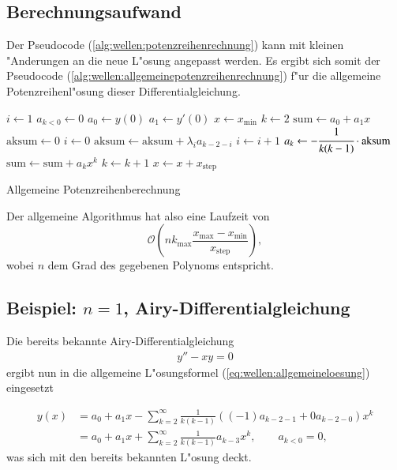 \subsection{Berechnungsaufwand}
Der Pseudocode (\ref{alg:wellen:potenzreihenrechnung}) kann mit kleinen 
"Anderungen an die neue L"osung angepasst werden. Es ergibt sich somit der 
Pseudocode (\ref{alg:wellen:allgemeinepotenzreihenrechnung}) f"ur die 
allgemeine Potenzreihenl"osung dieser Differentialgleichung.

\begin{algorithm}
	\begin{algorithmic}[1]
		\State $i \gets 1$
		\State $a_{k<0} \gets 0$
		\State $a_0 \gets y(0)$
		\State $a_1 \gets y'(0)$
		\State $x \gets x_{\text{min}}$
			\State $k \gets 2$
			\State $\text{sum} \gets a_0 + a_1x$
				\State $\text{aksum} \gets 0$
				\State $i \gets 0$
					\State $\text{aksum} \gets \text{aksum}+\lambda_i a_{k-2-i}$
					\State $i \gets i + 1$
				\EndFor
				\State $a_k \gets -\cfrac{1}{k(k-1)} \cdot \text{aksum}$
				\State $\text{sum} \gets \text{sum} + a_k x^k$
				\State $k \gets k + 1$
			\EndFor
			\State $x \gets x + x_{\text{step}}$
		\EndFor
	\end{algorithmic}
	\caption{Allgemeine Potenzreihenberechnung} 
	\label{alg:wellen:allgemeinepotenzreihenrechnung}
\end{algorithm}

Der allgemeine Algorithmus hat also eine Laufzeit von
\begin{equation*}
\mathcal{O}\left(nk_{\text{max}}\frac{x_{\text{max}}-x_{\text{min}}} 
{x_{\text{step}}}\right),
\end{equation*}
wobei $n$ dem Grad des gegebenen Polynoms entspricht.

\subsection{Beispiel: \texorpdfstring{$n = 1$}{n = 1}, 
Airy-Differentialgleichung}
Die bereits bekannte Airy-Differentialgleichung
\begin{align*}
	y''-xy = 0
\end{align*}
ergibt nun in die allgemeine L"osungsformel (\ref{eq:wellen:allgemeineloesung}) 
eingesetzt

\begin{equation*}
\begin{split}
	y(x) &= a_0+a_1x-\sum_{k=2}^{\infty} \frac{1}{k(k-1)} ((-1) a_{k-2-1} + 0 
	a_{k-2-0}) x^k
	\\
	&= a_0+a_1x+\sum_{k=2}^{\infty} \frac{1}{k(k-1)} a_{k-3} x^k,
	\qquad a_{k < 0} = 0,
\end{split}
\end{equation*}
was sich mit den bereits bekannten L"osung deckt.

